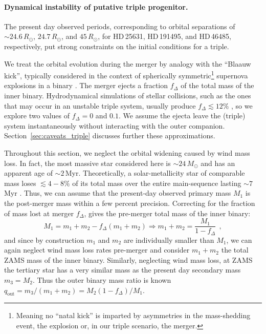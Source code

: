 \documentclass{aa}
\DeclareRobustCommand{\Secref}[1]{Section~\ref{#1}}
\begin{document}
\paragraph{Dynamical instability of putative triple progenitor.}
The present day observed periods, corresponding to orbital separations of
$\sim24.6\,R_\odot$, $24.7\,R_\odot$, and $45\,R_\odot$, for HD\,25631, HD\,191495, and HD\,46485,
respectively, put strong constraints on the initial conditions for a
triple.

We treat the orbital evolution during the merger by analogy with the
``Blaauw kick'', typically considered in the context of spherically
symmetric\footnote{Meaning no ``natal kick'' is imparted by
  asymmetries in the mass-shedding event, the explosion or, in our
  triple scenario, the merger.} supernova explosions in a binary
\citep{blaauw:61, boersma:61}. The merger ejects a fraction $f_\Delta$
of the total mass of the inner binary. Hydrodynamical simulations of
stellar collisions, such as the ones that may occur in an unstable
triple system, usually produce $f_\Delta\lesssim 12\%$
\citep[e.g.,][]{lombardi:02, glebbeek:13, renzo:20c, ballone:23}, so
we explore two values of $f_\Delta=0$ and $0.1$. We assume the ejecta
leave the (triple) system instantaneously without interacting with the
outer companion. \Secref{sec:caveats_triple} discusses further these
approximations.


Throughout this section, we neglect the orbital widening caused by
wind mass loss. In fact, the most massive star considered here is
$\sim24\,M_\odot$ and has an apparent age of $\sim2$\,Myr.
Theoretically, a solar-metallicity star of comparable mass loses
$\lesssim 4-8\%$ of its total mass over the entire main-sequence
lasting $\sim 7$\,Myr \citep{renzo:17}. Thus, we can assume that the
present-day observed primary mass $M_1$ is the post-merger mass within
a few percent precision. Correcting for the fraction of mass
lost at merger $f_\Delta$, gives the pre-merger total mass of the inner
binary:
\begin{equation}
  \label{eq:mtot_in}
  M_1 = m_1+m_2 - f_\Delta(m_1+m_2) \Rightarrow m_1+m_2 = \frac{M_1}{1-f_\Delta} \ \ ,
\end{equation}
and since by construction $m_1$ and $m_2$ are individually smaller
than $M_1$, we can again neglect wind mass loss rates pre-merger and
consider $m_1+m_2$ the total ZAMS mass of the
inner binary. Similarly, neglecting wind mass loss, at ZAMS the
tertiary star has a very similar mass as the present day secondary mass
$m_3=M_2$. Thus the outer binary mass ratio is known
$q_\mathrm{out}=m_3/(m_1+m_2)= M_2(1-f_\Delta)/M_1$.
\end{document}
